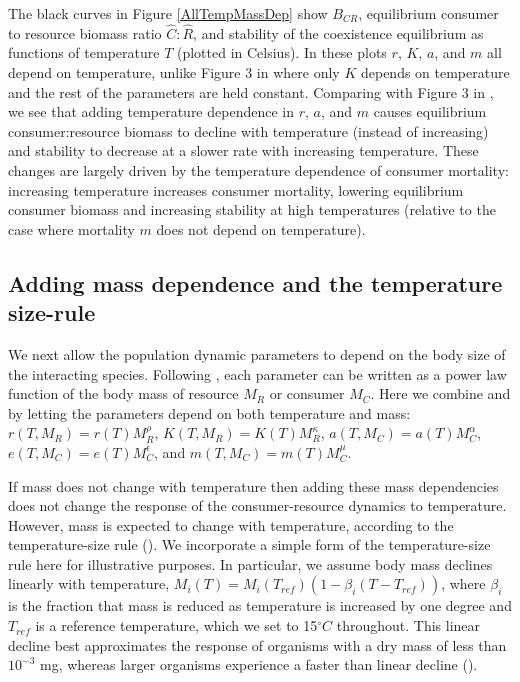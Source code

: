 \documentclass[11pt]{article}
\begin{document}
The black curves in Figure \ref{AllTempMassDep} show $B_{CR}$, equilibrium consumer to resource biomass ratio $\hat{C}:\hat{R}$, and stability of the coexistence equilibrium as functions of temperature $T$ (plotted in Celsius).
In these plots $r$, $K$, $a$, and $m$ all depend on temperature, unlike Figure 3 in \cite{Gilbert2014} where only $K$ depends on temperature and the rest of the parameters are held constant.
Comparing with Figure 3 in \cite{Gilbert2014}, we see that adding temperature dependence in $r$, $a$, and $m$ causes equilibrium consumer:resource biomass to decline with temperature (instead of increasing) and stability to decrease at a slower rate  with increasing temperature.
These changes are largely driven by the temperature dependence of consumer mortality: increasing temperature increases consumer mortality, lowering equilibrium consumer biomass and increasing stability at high temperatures (relative to the case where mortality $m$ does not depend on temperature).

\subsection*{Adding mass dependence and the temperature size-rule}

We next allow the population dynamic parameters to depend on the body size of the interacting species.
Following \cite{DeLong2015}, each parameter can be written as a power law function of the body mass of resource $M_R$ or consumer $M_C$.
Here we combine \cite{DeLong2015} and \cite{Gilbert2014} by letting the parameters depend on both temperature and mass: $r(T, M_R) = r(T) M_R^\rho$, $K(T, M_R) = K(T) M_R^\kappa$, $a(T, M_C) = a(T) M_C^\alpha$, $e(T, M_C) = e(T) M_C^\epsilon$, and $m(T, M_C) = m(T) M_C^\mu$.

If mass does not change with temperature then adding these mass dependencies does not change the response of the consumer-resource dynamics to temperature.
However, mass is expected to change with temperature, according to the temperature-size rule (\cite{Atkinson1994}).
We incorporate a simple form of the temperature-size rule here for illustrative purposes.
In particular, we assume body mass declines linearly with temperature, $M_i(T) = M_i(T_{ref}) (1 - \beta_i (T - T_{ref}))$, where $\beta_i$ is the fraction that mass is reduced as temperature is increased by one degree and $T_{ref}$ is a reference temperature, which we set to 15$^\circ C$ throughout.
This linear decline best approximates the response of organisms with a dry mass of less than $10^{-3}$ mg, whereas larger organisms experience a faster than linear decline (\cite{Forster2012}).
\end{document}
